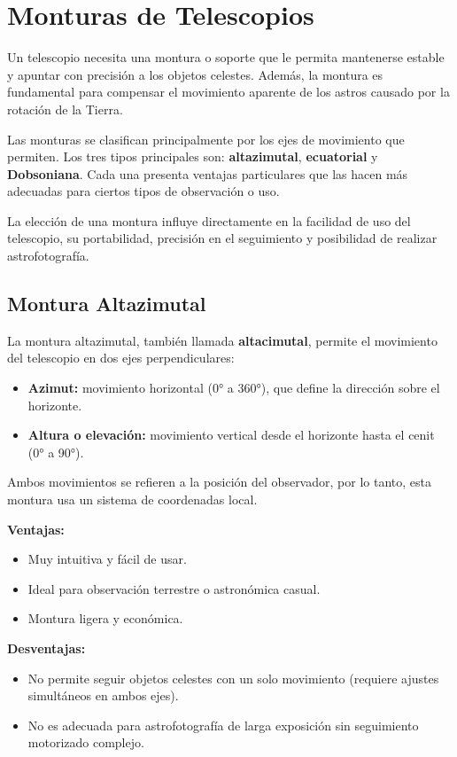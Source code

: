 \section{Monturas de Telescopios}
\label{sec:monturas_telescopios}

Un telescopio necesita una montura o soporte que le permita mantenerse estable y apuntar con precisión a los objetos celestes. Además, la montura es fundamental para compensar el movimiento aparente de los astros causado por la rotación de la Tierra.

Las monturas se clasifican principalmente por los ejes de movimiento que permiten. Los tres tipos principales son: \textbf{altazimutal}, \textbf{ecuatorial} y \textbf{Dobsoniana}. Cada una presenta ventajas particulares que las hacen más adecuadas para ciertos tipos de observación o uso.

La elección de una montura influye directamente en la facilidad de uso del telescopio, su portabilidad, precisión en el seguimiento y posibilidad de realizar astrofotografía.

\subsection{Montura Altazimutal}
\label{sec:montura_altazimutal}

La montura altazimutal, también llamada \textbf{altacimutal}, permite el movimiento del telescopio en dos ejes perpendiculares:

\begin{itemize}
	\item \textbf{Azimut:} movimiento horizontal (0° a 360°), que define la dirección sobre el horizonte.
	\item \textbf{Altura o elevación:} movimiento vertical desde el horizonte hasta el cenit (0° a 90°).
\end{itemize}

Ambos movimientos se refieren a la posición del observador, por lo tanto, esta montura usa un sistema de coordenadas local.

\textbf{Ventajas:}
\begin{itemize}
	\item Muy intuitiva y fácil de usar.
	\item Ideal para observación terrestre o astronómica casual.
	\item Montura ligera y económica.
\end{itemize}

\textbf{Desventajas:}
\begin{itemize}
	\item No permite seguir objetos celestes con un solo movimiento (requiere ajustes simultáneos en ambos ejes).
	\item No es adecuada para astrofotografía de larga exposición sin seguimiento motorizado complejo.
\end{itemize}

